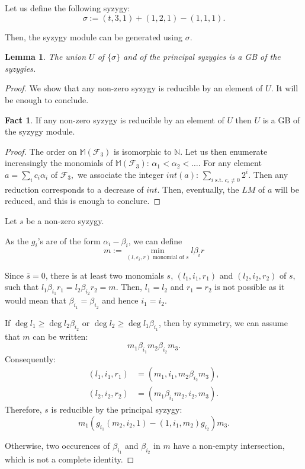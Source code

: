 \documentclass[sigconf]{acmart}
\theoremstyle{plain}
\newtheorem{lem}{Lemma}[section]
\theoremstyle{definition}
\newtheorem*{fact}{Fact}
\theoremstyle{remark}
\newcommand{\NN}{\mathbb N}
\newcommand{\MM}{\mathbb M}
\newcommand{\LM}{LM}
\begin{document}
Let us define the
following syzygy:
$$\sigma := (t, 3, 1) + (1, 2, 1) - (1, 1, 1).$$

Then, the syzygy module
can be generated using $\sigma.$
\begin{lem}
	The union $U$ of $\{\sigma\}$ and of the principal syzygies is a GB
	of the syzygies.
\end{lem}
\begin{proof}
We show that any non-zero
syzygy is reducible by
an element of $U.$
It will be enough to 
conclude.
\begin{fact}
	If any non-zero
syzygy is reducible by
an element of $U$
then $U$ is a GB 
of the syzygy module.
\end{fact}
\begin{proof}
The order on $\MM \left( \mathscr{F}_3 \right)$
is isomorphic to $\NN.$
Let us then enumerate
increasingly the monomials
of $\MM \left( \mathscr{F}_3 \right)$:
$\alpha_1 < \alpha_2< \dots.$
For any element $a=\sum_i c_i \alpha_i$ of 
$\mathscr{F}_3,$
we associate the integer
$int(a)$:
$\sum_{i \textrm{ s.t. } c_i \neq 0} 2^i.$
Then any reduction
corresponds to a decrease
of $int.$
Then, eventually,
the $\LM$ of $a$
will be reduced,
and this is enough to conclure. 
\end{proof}

	Let $s$ be a non-zero syzygy.
	
	As the $g_i$'s are of the form $\alpha_i - \beta_i$, 
	we can define
	$$m := \min_{(l, \varepsilon_i, r) \mbox{ monomial of } s} l \beta_i r$$
	
	Since $\overline{s} = 0$, there is at least
	two monomials $s$, $(l_1, i_1, r_1)$ and $(l_2, i_2, r_2)$ of $s$, such that $l_1 \beta_{i_1} r_1 = l_2 \beta_{i_2} r_2 = m$.
	Then, $l_1 = l_2$ and $r_1 = r_2$ is not possible
	as it would mean that 
	$\beta_{i_1} = \beta_{i_2}$ and hence $i_1 = i_2$.
	
	If $\deg{l_1} \geq \deg{l_2 \beta_{i_2}}$ or $\deg{l_2} \geq \deg{l_1 \beta_{i_1}}$, then by
	symmetry, we can assume that $m$ can be written:
	$$m_1 \beta_{i_1} m_2 \beta_{i_2} m_3.$$
	Consequently:
	\begin{align*}
		(l_1, i_1, r_1) &= (m_1, i_1, m_2 \beta_{i_2} m_3), \\
		(l_2, i_2, r_2) &= (m_1 \beta_{i_1} m_2, i_2, m_3).
	\end{align*}
	Therefore, $s$ is reducible by the principal
	syzygy:
	$$m_1 (g_{i_1} (m_2, i_2, 1) - (1, i_1, m_2) g_{i_2}) m_3.$$
	
	Otherwise, two
	occurences of $\beta_{i_1}$ and $\beta_{i_2}$ in $m$
	have a non-empty intersection, which is not
	a complete identity.
	

\end{proof}
\end{document}
